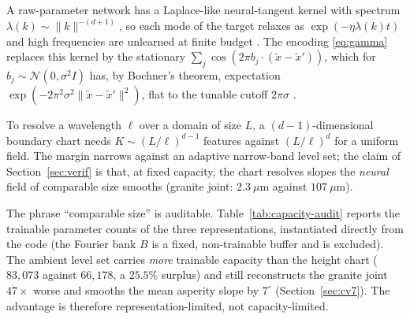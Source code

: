 \documentclass{svjour3}                 %
\newcommand{\norm}[1]{\lVert#1\rVert}
\begin{document}
\begin{remark}\label{prop:ntk}
A raw-parameter network has a Laplace-like neural-tangent kernel \citep{jacot2018ntk} with spectrum
$\lambda(k)\sim\norm{k}^{-(d+1)}$, so each mode of the target relaxes as $\exp(-\eta\lambda(k)t)$ and high
frequencies are unlearned at finite budget \citep{rahaman2019spectral,xu2020frequency}. The encoding
\eqref{eq:gamma} replaces this kernel by the stationary $\sum_j\cos(2\pi b_j\!\cdot\!(\tilde x-\tilde x'))$,
which for $b_j\sim\mathcal N(0,\sigma^2 I)$ has, by Bochner's theorem, expectation
$\exp(-2\pi^2\sigma^2\norm{\tilde x-\tilde x'}^2)$, flat to the tunable cutoff $2\pi\sigma$
\citep{tancik2020fourier}.
\end{remark}

\begin{remark}[Capacity]\label{cor:capacity}
To resolve a wavelength $\ell$ over a domain of size $L$, a $(d{-}1)$-dimensional boundary chart needs
$K\sim(L/\ell)^{d-1}$ features against $(L/\ell)^{d}$ for a uniform field. The margin narrows against an
adaptive narrow-band level set; the claim of Section~\ref{sec:verif} is that, at fixed capacity, the chart
resolves slopes the \emph{neural} field of comparable size smooths (granite joint: $2.3~\mu$m against
$107~\mu$m).
\end{remark}

The phrase ``comparable size'' is auditable. Table~\ref{tab:capacity-audit} reports the trainable parameter
counts of the three representations, instantiated directly from the code (the Fourier bank $B$ is a fixed,
non-trainable buffer and is excluded). The ambient level set carries \emph{more} trainable capacity than the
height chart ($83{,}073$ against $66{,}178$, a $25.5\%$ surplus) and still reconstructs the granite joint
$47\times$ worse and smooths the mean asperity slope by $7^\circ$ (Section~\ref{sec:cv7}). The advantage is
therefore representation-limited, not capacity-limited.
\end{document}

